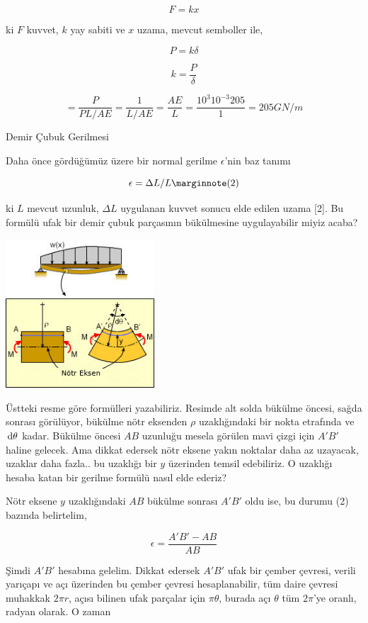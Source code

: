 \documentclass[12pt,fleqn]{article}\usepackage{../../common}
\begin{document}
$$
F = k x
$$

ki $F$ kuvvet, $k$ yay sabiti ve $x$ uzama, mevcut semboller ile,

$$
P = k \delta
$$

$$
k = \frac{P}{\delta}
$$

$$
= \frac{P}{PL / AE} = \frac{1}{L / AE} = \frac{AE}{L} =
\frac{10^3 10^{-3} 205}{1} =
205 GN/m
$$

Demir Çubuk Gerilmesi

Daha önce gördüğümüz üzere bir normal gerilme $\epsilon$'nin baz tanımı

$$
\epsilon = \Delta L / L
\mlabel{2}
$$

ki $L$ mevcut uzunluk, $\Delta L$ uygulanan kuvvet sonucu elde edilen uzama [2].
Bu formülü ufak bir demir çubuk parçasının bükülmesine uygulayabilir miyiz
acaba? 

\includegraphics[width=15em]{phy_020_strs_00_03.jpg}

Üstteki resme göre formülleri yazabiliriz. Resimde alt solda bükülme öncesi,
sağda sonrası görülüyor, bükülme nötr eksenden $\rho$ uzaklığındaki bir nokta
etrafında ve $\,\mathrm{d}\theta$ kadar. Bükülme öncesi $AB$ uzunluğu mesela görülen mavi
çizgi için $A'B'$ haline gelecek. Ama dikkat edersek nötr eksene yakın noktalar
daha az uzayacak, uzaklar daha fazla.. bu uzaklığı bir $y$ üzerinden temsil
edebiliriz. O uzaklığı hesaba katan bir gerilme formülü nasıl elde ederiz?

Nötr eksene $y$ uzaklığındaki $AB$ bükülme sonrası $A'B'$ oldu ise, bu durumu
(2) bazında belirtelim,

$$
\epsilon = \frac{A'B' - AB}{AB}
$$

Şimdi $A'B'$ hesabına gelelim. Dikkat edersek $A'B'$ ufak bir çember çevresi,
verili yarıçapı ve açı üzerinden bu çember çevresi hesaplanabilir, tüm daire
çevresi muhakkak $2 \pi r$, açısı bilinen ufak parçalar için $\pi \theta$,
burada açı $\theta$ tüm $2 \pi$'ye oranlı, radyan olarak. O zaman
\end{document}
